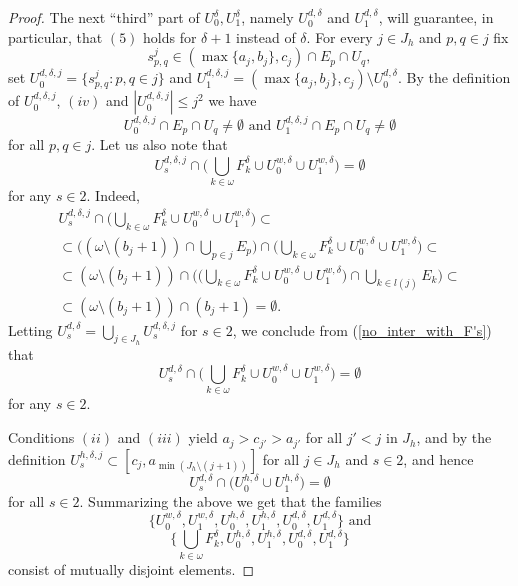 \documentclass[12pt,a4paper]{amsart}
\theoremstyle{definition}
\newcommand{\w}{\omega}
\begin{document}
\begin{proof}
The next ``third'' part of $U^\delta_0,U^\delta_1$, namely
$U^{d,\delta}_0$ and $U^{d,\delta}_1$, will guarantee, in particular,
that $(5)$ holds for $\delta+1$ instead of $\delta$.
For every $j\in J_h$ and $p,q\in j$ fix 
$$s^j_{p,q}\in (\max\{a_j,b_j\},c_j)\cap E_p\cap U_q,$$
 set $U^{d,\delta,j}_0=\{s^j_{p,q}:p,q\in j\}$ and
 $U^{d,\delta,j}_1=(\max\{a_j,b_j\},c_j)\setminus U^{d,\delta}_0$.
 By the definition of $U^{d,\delta,j}_0$, $(iv)$ and $|U^{d,\delta,j}_0|\leq j^2$ we have 
 \begin{equation}\label{all_e_dense}
 U^{d,\delta,j}_0\cap E_p\cap U_q\neq \emptyset \mbox{ \ and\  } U^{d,\delta,j}_1\cap E_p\cap U_q\neq \emptyset
 \end{equation}
 for all $p,q\in j$. Let us also note that 
 \begin{equation} \label{no_inter_with_F's}
 U^{d,\delta,j}_s\cap \big (\bigcup_{k\in \w}F^\delta_k\cup U^{w,\delta}_0\cup U^{w,\delta}_1\big)=\emptyset
 \end{equation}
for any $s\in 2$. Indeed, 
\begin{eqnarray*}
U^{d,\delta,j}_s\cap \big (\bigcup_{k\in \w}F^\delta_k\cup U^{w,\delta}_0\cup U^{w,\delta}_1\big)\subset \\
\subset \big((\w\setminus (b_j+1))\cap\bigcup_{p\in j}E_p\big) \cap
(\bigcup_{k\in \w}F^\delta_k\cup U^{w,\delta}_0\cup U^{w,\delta}_1\big)\subset \\
\subset (\w\setminus (b_j+1))\cap  
\Big(\big (\bigcup_{k\in \w}F^\delta_k\cup U^{w,\delta}_0\cup U^{w,\delta}_1\big)\cap\bigcup_{k\in l(j)}E_k\Big)\subset \\
\subset (\w\setminus (b_j+1))\cap (b_j+1)=\emptyset.
\end{eqnarray*}
Letting $U^{d,\delta}_s=\bigcup_{j\in J_h}U^{d,\delta,j}_s$
for $s\in 2$, we conclude from (\ref{no_inter_with_F's})
that 
\begin{equation} \label{no_inter_with_F's_1}
 U^{d,\delta}_s\cap \big (\bigcup_{k\in \w}F^\delta_k\cup U^{w,\delta}_0\cup U^{w,\delta}_1\big)=\emptyset
 \end{equation}
for any $s\in 2$. 

Conditions $(ii)$ and $(iii)$ yield
$a_j>c_{j'}>a_{j'}$
for all $j'<j$ in $J_h$, and  by the definition $U^{h,\delta,j}_s\subset [c_j,a_{\min(J_h\setminus(j+1))}]$ for all
$j\in J_h$ and $s\in 2$, and
hence 
\begin{equation} \label{no_inter_with_h's}
 U^{d,\delta}_s\cap \big(U^{h,\delta}_0\cup U^{h,\delta}_1\big)=\emptyset
 \end{equation}
for all $s\in 2$. Summarizing the above we get that 
the families
$$\{U^{w,\delta}_0,U^{w,\delta}_1, U^{h,\delta}_0,U^{h,\delta}_1, U^{d,\delta}_0,U^{d,\delta}_1\} \mbox{ \ \ \ and}$$
$$\{\bigcup_{k\in\w}F^\delta_k, U^{h,\delta}_0,U^{h,\delta}_1, U^{d,\delta}_0,U^{d,\delta}_1\} $$
consist of mutually disjoint elements. 


\end{proof}
\end{document}
